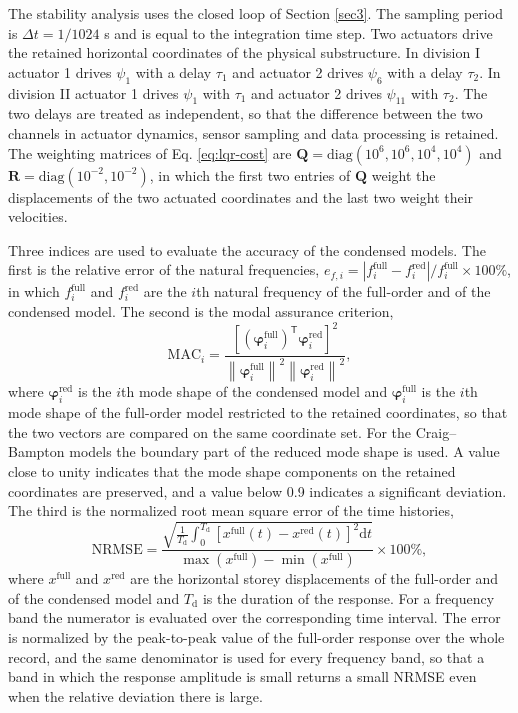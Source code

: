 \documentclass[11pt,a4paper]{article}
\numberwithin{equation}{section}
\begin{document}
The stability analysis uses the closed loop of Section \ref{sec3}. The sampling period is \(\Delta t=1/1024\) s and is equal to the integration time step. Two actuators drive the retained horizontal coordinates of the physical substructure. In division I actuator 1 drives \(\psi_{1}\) with a delay \(\tau_{1}\) and actuator 2 drives \(\psi_{6}\) with a delay \(\tau_{2}\). In division II actuator 1 drives \(\psi_{1}\) with \(\tau_{1}\) and actuator 2 drives \(\psi_{11}\) with \(\tau_{2}\). The two delays are treated as independent, so that the difference between the two channels in actuator dynamics, sensor sampling and data processing is retained. The weighting matrices of Eq. \eqref{eq:lqr-cost} are \(\mathbf{Q}=\mathrm{diag}(10^{6},10^{6},10^{4},10^{4})\) and \(\mathbf{R}=\mathrm{diag}(10^{-2},10^{-2})\), in which the first two entries of \(\mathbf{Q}\) weight the displacements of the two actuated coordinates and the last two weight their velocities.

Three indices are used to evaluate the accuracy of the condensed models. The first is the relative error of the natural frequencies, \(e_{f,i}=|f_{i}^{\mathrm{full}}-f_{i}^{\mathrm{red}}|/f_{i}^{\mathrm{full}}\times100\%\), in which \(f_{i}^{\mathrm{full}}\) and \(f_{i}^{\mathrm{red}}\) are the \(i\)th natural frequency of the full-order and of the condensed model. The second is the modal assurance criterion,
\begin{equation}
	\mathrm{MAC}_{i}=
	\frac{\left[\left(\bm{\varphi}_{i}^{\mathrm{full}}\right)^{\mathsf{T}}
		\bm{\varphi}_{i}^{\mathrm{red}}\right]^{2}}
	{\left\|\bm{\varphi}_{i}^{\mathrm{full}}\right\|^{2}
		\left\|\bm{\varphi}_{i}^{\mathrm{red}}\right\|^{2}},
	\label{eq:mac}
\end{equation}
where \(\bm{\varphi}_{i}^{\mathrm{red}}\) is the \(i\)th mode shape of the condensed model and \(\bm{\varphi}_{i}^{\mathrm{full}}\) is the \(i\)th mode shape of the full-order model restricted to the retained coordinates, so that the two vectors are compared on the same coordinate set. For the Craig--Bampton models the boundary part of the reduced mode shape is used. A value close to unity indicates that the mode shape components on the retained coordinates are preserved, and a value below 0.9 indicates a significant deviation. The third is the normalized root mean square error of the time histories,
\begin{equation}
	\mathrm{NRMSE}=
	\frac{\displaystyle\sqrt{\frac{1}{T_{\mathrm{d}}}\int_{0}^{T_{\mathrm{d}}}
			\left[x^{\mathrm{full}}(t)-x^{\mathrm{red}}(t)\right]^{2}\mathrm{d}t}}
	{\max\left(x^{\mathrm{full}}\right)-\min\left(x^{\mathrm{full}}\right)}
	\times100\%,
	\label{eq:nrmse}
\end{equation}
where \(x^{\mathrm{full}}\) and \(x^{\mathrm{red}}\) are the horizontal storey displacements of the full-order and of the condensed model and \(T_{\mathrm{d}}\) is the duration of the response. For a frequency band the numerator is evaluated over the corresponding time interval. The error is normalized by the peak-to-peak value of the full-order response over the whole record, and the same denominator is used for every frequency band, so that a band in which the response amplitude is small returns a small NRMSE even when the relative deviation there is large.
\end{document}
